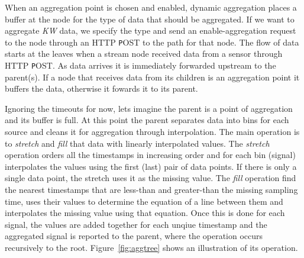 When an aggregation point is chosen and enabled, dynamic aggregation places a buffer at the node for the type
of data that should be aggregated.  If we want to aggregate \emph{KW} data, we specify the type and send an enable-aggregation
request to the node through an HTTP {\texttt POST} to the path for that node.  The flow of data starts at the leaves when
a stream node received data from a sensor through HTTP {\texttt POST}.  As data arrives it is immediately
forwarded upstream to the parent(s).  If a node that receives data from its children is an aggregation point it buffers
the data, otherwise it fowards it to its parent.

Ignoring the timeouts for now, lets imagine the parent is a point of aggregation and its buffer is full.  At this point
the parent separates data into bins for each source and cleans it for aggregation through interpolation.  The main
operation is to \emph{stretch} and \emph{fill} that data with linearly interpolated values.  The \emph{stretch}
operation orders all the timestamps in increasing order and for each bin (signal) interpolates the values using the
first (last) pair of data points.  If there is only a single data point, the stretch uses it as the missing value.
The \emph{fill} operation find the nearest timestamps that are less-than and greater-than the missing sampling time, 
uses their values to determine the equation of a line between them and interpolates the missing value using that equation.
Once this is done for each signal, the values are added together for each unqiue timestamp and the aggregated
signal is reported to the parent, where the operation occurs recursively to the root.
Figure~\ref{fig:aggtree} shows an illustration of its operation.  



